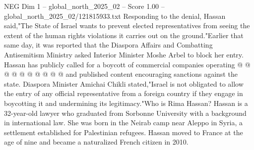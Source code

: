 \begin{textsample}{NEG Dim 1 – global\_north\_2025\_02 – Score 1.00 – global\_north\_2025\_02/121815933.txt}
Responding to the denial, Hassan said,"The State of Israel wants to prevent elected representatives from seeing the extent of the human rights violations it carries out on the ground."Earlier that same day, it was reported that the Diaspora Affairs and Combatting Antisemitism Ministry asked Interior Minister Moshe Arbel to block her entry.
Hassan has publicly called for a boycott of commercial companies operating @ @ @ @ @ @ @ @ @ @ and published content encouraging sanctions against the state.
Diaspora Minister Amichai Chikli stated,"Israel is not obligated to allow the entry of any official representative from a foreign country if they engage in boycotting it and undermining its legitimacy."Who is Rima Hassan?
Hassan is a 32-year-old lawyer who graduated from Sorbonne University with a background in international law.
She was born in the Neirab camp near Aleppo in Syria, a settlement established for Palestinian refugees.
Hassan moved to France at the age of nine and became a naturalized French citizen in 2010.

\end{textsample}

